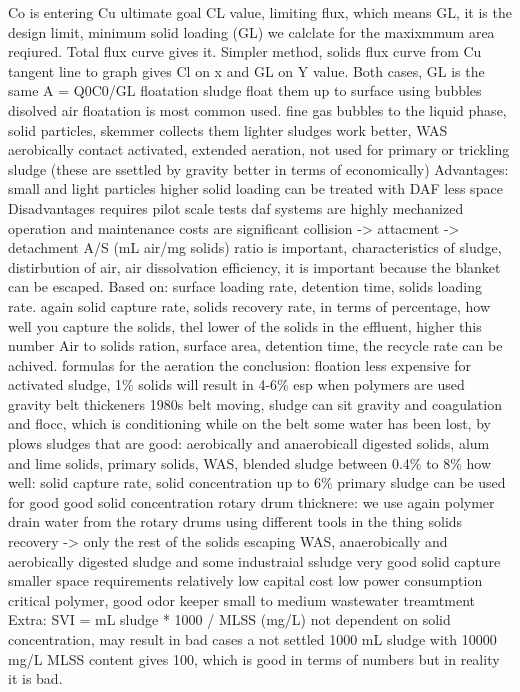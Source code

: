 \documentclass[12pt]{article}
\begin{document}
Co is entering Cu ultimate goal
CL value, limiting flux, which means GL, it is the design limit, minimum solid loading (GL) we calclate for the maxixmmum area reqiured.
Total flux curve gives it. Simpler method, solids flux curve from Cu tangent line to graph gives Cl on x and GL on Y value. Both cases, GL is the same
A = Q0C0/GL
floatation sludge
float them up to surface using bubbles
disolved air floatation is most common used.
fine gas bubbles to the liquid phase, solid particles, skemmer collects them
lighter sludges work better, WAS aerobically contact activated, extended aeration, not used for primary  or trickling sludge (these are ssettled by gravity better in terms of economically)
Advantages:
small and light particles
higher solid loading can be treated with DAF
less space
Disadvantages
requires pilot scale tests
daf systems are highly mechanized
operation and maintenance costs are significant
collision -> attacment -> detachment
A/S (mL air/mg solids) ratio is important, characteristics of sludge, distirbution of air, air dissolvation efficiency, it is important because the blanket can be escaped.
Based on: surface loading rate, detention time, solids loading rate.
again solid capture rate, solids recovery rate, in terms of percentage, how well you capture the solids, thel lower of the solids in the effluent, higher this number
Air to solids ration, surface area, detention time, the recycle rate can be achived.
formulas for the aeration
the conclusion: floation less expensive for activated sludge, 1\% solids will result in 4-6\% esp when polymers are used
gravity belt thickeners
1980s
belt moving, sludge can sit
gravity and coagulation and flocc, which is conditioning
while on the belt some water has been lost, by plows
sludges that are good: aerobically and anaerobicall digested solids, alum and lime solids, primary solids, WAS, blended sludge between 0.4\% to 8\%
how well: solid capture rate, solid concentration up to 6\%
primary sludge can be used for good good solid concentration
rotary drum thicknere:
we use again polymer
drain water from the rotary drums using different tools in the thing
solids recovery -> only the rest of the solids escaping
WAS, anaerobically and aerobically digested sludge and some industraial ssludge
very good solid capture
smaller space requirements relatively low capital cost low power consumption
critical polymer, good odor keeper
small to medium wastewater treamtment
Extra:
SVI = mL sludge * 1000 / MLSS (mg/L)
not dependent on solid concentration, may result in bad cases
a not settled 1000 mL sludge with 10000 mg/L MLSS content gives 100, which is good in terms of numbers but in reality it is bad.
\end{document}
